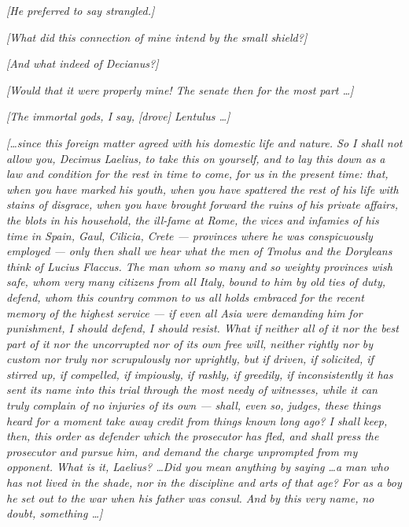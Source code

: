  \textit{[He preferred to say strangled.]}

 \textit{[What did this connection of mine intend by the small shield?]}

 \textit{[And what indeed of Decianus?]}

 \textit{[Would that it were properly mine! The senate then for the most part \ldots]}

 \textit{[The immortal gods, I say, [drove] Lentulus \ldots]}

 \textit{[\ldots since this foreign matter agreed with his domestic life and nature. So I shall not allow you, Decimus Laelius, to take this on yourself, and to lay this down as a law and condition for the rest in time to come, for us in the present time: that, when you have marked his youth, when you have spattered the rest of his life with stains of disgrace, when you have brought forward the ruins of his private affairs, the blots in his household, the ill-fame at Rome, the vices and infamies of his time in Spain, Gaul, Cilicia, Crete --- provinces where he was conspicuously employed --- only then shall we hear what the men of Tmolus and the Doryleans think of Lucius Flaccus. The man whom so many and so weighty provinces wish safe, whom very many citizens from all Italy, bound to him by old ties of duty, defend, whom this country common to us all holds embraced for the recent memory of the highest service --- if even all Asia were demanding him for punishment, I should defend, I should resist. What if neither all of it nor the best part of it nor the uncorrupted nor of its own free will, neither rightly nor by custom nor truly nor scrupulously nor uprightly, but if driven, if solicited, if stirred up, if compelled, if impiously, if rashly, if greedily, if inconsistently it has sent its name into this trial through the most needy of witnesses, while it can truly complain of no injuries of its own --- shall, even so, judges, these things heard for a moment take away credit from things known long ago? I shall keep, then, this order as defender which the prosecutor has fled, and shall press the prosecutor and pursue him, and demand the charge unprompted from my opponent. What is it, Laelius? \ldots Did you mean anything by saying \ldots a man who has not lived in the shade, nor in the discipline and arts of that age? For as a boy he set out to the war when his father was consul. And by this very name, no doubt, something \ldots]}

